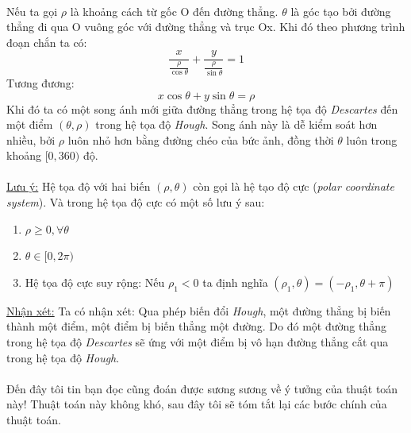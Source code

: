 \documentclass{article}
\begin{document}
    \phantom{a}\\
    Nếu ta gọi $\rho$ là khoảng cách từ gốc O đến đường thẳng. $\theta$ là góc tạo bởi đường thẳng đi qua O vuông góc với đường thẳng và trục Ox. Khi đó theo phương trình đoạn chắn ta có:
    $$\frac{x}{\frac{\rho}{\cos \theta}}+\frac{y}{\frac{\rho}{\sin \theta }} = 1$$
    Tương đương:
    \begin{equation}
         x \cos \theta + y \sin \theta = \rho
         \label{eq6}
    \end{equation}
    Khi đó ta có một song ánh mới giữa đường thẳng trong hệ tọa độ \textit{Descartes} đến một điểm $(\theta,\rho)$ trong hệ tọa độ \textit{Hough}. Song ánh này là dễ kiểm soát hơn nhiều, bởi $\rho$ luôn nhỏ hơn bằng đường chéo của bức ảnh, đồng thời $\theta$ luôn trong khoảng $[0, 360)$ độ.\\\\
    \underline{Lưu ý:} Hệ tọa độ với hai biến $(\rho,\theta)$ còn gọi là hệ tạo độ cực (\textit{polar coordinate system}). Và trong hệ tọa độ cực có một số lưu ý sau:
    \begin{enumerate}
        \item $\rho \geq 0, \forall \theta$
        \item $\theta \in [0, 2\pi)$ 
        \item Hệ tọa độ cực suy rộng: Nếu $\rho_1 <0$ ta định nghĩa $(\rho_1, \theta) = (-\rho_1,\theta + \pi)$
    \end{enumerate}
    \underline{Nhận xét:} Ta có nhận xét: Qua phép biến đổi \textit{Hough}, một đường thẳng bị biến thành một điểm, một điểm bị biến thẳng một đường. Do đó một đường thẳng trong hệ tọa độ \textit{Descartes} sẽ ứng với một điểm bị vô hạn đường thẳng cắt qua trong hệ tọa độ \textit{Hough}.\\\\
    Đến đây tôi tin bạn đọc cũng đoán được sương sương về ý tưởng của thuật toán này! Thuật toán này không khó, sau đây tôi sẽ tóm tắt lại các bước chính của thuật toán.
\end{document}
